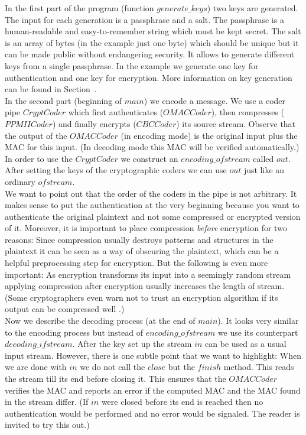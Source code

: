 In the first part of the program (function $\mathit{generate\_keys}$) two keys
are generated. The input for each generation is a passphrase and a salt. The
passphrase is a human-readable and easy-to-remember string which must be kept
secret. The salt is an array of bytes (in the example just one byte) which
should be unique but it can be made public without endangering security. It
allows to generate different keys from a single passphrase. In the example we
generate one key for authentication and one key for encryption. 
More information on key generation can be found in Section~. \\
In the second part (beginning of $\mathit{main}$) we encode a message. We use
a coder pipe $\mathit{CryptCoder}$ which first authenticates
($\mathit{OMACCoder}$), then compresses ($\mathit{PPMIICoder}$) and finally
encrypts ($\mathit{CBCCoder}$) its source stream. 
Observe that the output of the $\mathit{OMACCoder}$ (in encoding mode) is the
original input plus the MAC for this input. (In decoding mode this MAC will be
verified automatically.)
In order to use the $\mathit{CryptCoder}$ we construct an 
$\mathit{encoding\_ofstream}$ called $\mathit{out}$. After setting the keys of 
the cryptographic coders we can use $\mathit{out}$ just like an ordinary 
$\mathit{ofstream}$. \\
We want to point out that the order of the coders in the pipe is not
arbitrary. It makes sense to put the authentication at the very beginning 
because you want to authenticate the original plaintext and not some compressed
or encrypted version of it. Moreover, it is important to place compression
\emph{before} encryption for two reasons: Since compression usually destroys
patterns and structures in the plaintext it can be seen as a way of obscuring
the plaintext, which can be a helpful preprocessing step for encryption. 
But the following is even more important: As encryption transforms its input
into a seemingly random stream applying compression after encryption usually
increases the length of stream. (Some cryptographers even warn not to trust an
encryption algorithm if its output can be compressed well \cite{Schneier}.)\\
Now we describe the decoding process (at the end of $\mathit{main}$).
It looks very similar to the encoding process but instead of
$\mathit{encoding\_ofstream}$ we use its counterpart
$\mathit{decoding\_ifstream}$. After the key set up the stream $\mathit{in}$
can be used as a usual \CC{} input stream. However, there is one subtle point
that we want to highlight: When we are done with $\mathit{in}$ we do not call 
the $\mathit{close}$ but the $\mathit{finish}$ method. This reads the stream
till its end before closing it. This ensures that the $\mathit{OMACCoder}$
verifies the MAC and reports an error if the computed MAC and the MAC found in
the stream differ.
(If $\mathit{in}$ were closed before its end is reached then no authentication
would be performed and no error would be signaled. The reader is invited to
try this out.)

